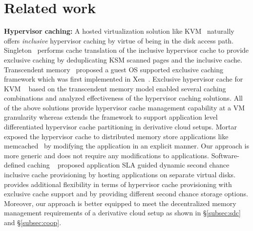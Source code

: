 \section{Related work}
\label{sec:related}
\noindent
{\bf Hypervisor caching:} A hosted virtualization solution like 
KVM~\cite{kvm, kvmconfig} naturally offers \emph{inclusive}
hypervisor caching by virtue of being in the disk access path.
%
Singleton~\cite{singleton} performs cache translation of the
inclusive hypervisor cache to provide exclusive caching by deduplicating
KSM scanned pages and the inclusive cache.
%
Transcendent memory~\cite{memtrans} proposed a guest OS supported
exclusive caching framework which was
first implemented in Xen~\cite{oracletmem}.
%  
Exclusive hypervisor cache for KVM ~\cite{kvmzcache} based on the 
transcendent memory model enabled several caching combinations and 
analyzed effectiveness of the hypervisor caching solutions.
%  
All of the above solutions provide hypervisor cache management capability
at a VM granularity whereas \dd{} extends the framework to support application
level differentiated hypervisor cache partitioning in derivative
cloud setups.
%
Mortar~\cite{mortar} exposed the hypervisor cache to distributed memory store 
applications like \textrm{memcached}~\cite{memcached} by modifying the application in an
explicit manner.
%
Our approach is more generic and does not require any modifications to 
applications.
%
Software-defined caching ~\cite{sdc} proposed application SLA guided 
dynamic second chance inclusive cache provisioning by hosting applications 
on separate virtual disks.
%
\dd{} provides additional flexibility in terms of hypervisor cache provisioning
with exclusive cache support and by providing different second chance storage options.
%
Moreover, our approach is better equipped to meet the decentralized memory 
management requirements of a derivative cloud setup as shown 
in \S\ref{subsec:sdc} and \S\ref{subsec:coop}.

